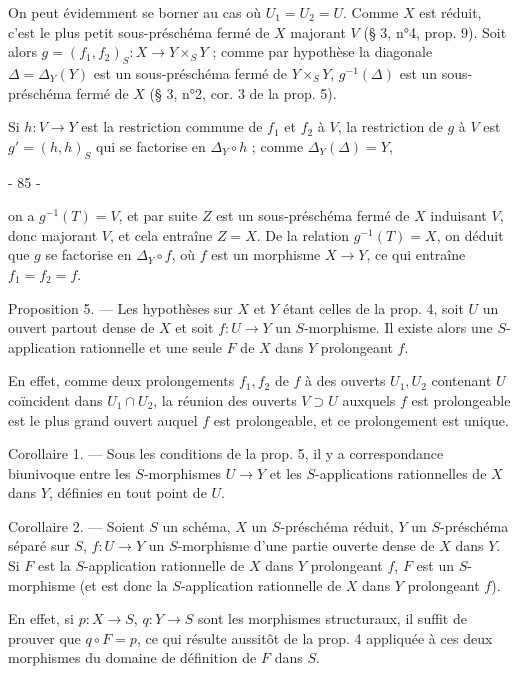 On peut évidemment se borner au cas où $U_1 = U_2 = U$. Comme $X$ est réduit, c'est le plus petit sous-préschéma fermé de $X$ majorant $V$ (§ 3, n°4, prop. 9). Soit alors $g = (f_1, f_2)_S : X \to Y \times_S Y$ ; comme par hypothèse la diagonale $\Delta = \Delta_Y(Y)$ est un sous-préschéma fermé de $Y \times_S Y$, $g^{-1}(\Delta)$ est un sous-préschéma fermé de $X$ (§ 3, n°2, cor. 3 de la prop. 5).

Si $h : V \to Y$ est la restriction commune de $f_1$ et $f_2$ à $V$, la restriction de $g$ à $V$ est $g' = (h, h)_S$ qui se factorise en $\Delta_Y \circ h$ ; comme $\Delta_Y(\Delta) = Y$,

\newpage


- 85 -

on a $g^{-1}(T) = V$, et par suite $Z$ est un sous-préschéma fermé de $X$ induisant $V$, donc majorant $V$, et cela entraîne $Z = X$. De la relation $g^{-1}(T) = X$, on déduit que $g$ se factorise en $\Delta_Y \circ f$, où $f$ est un morphisme $X \to Y$, ce qui entraîne $f_1 = f_2 = f$.

Proposition 5. — Les hypothèses sur $X$ et $Y$ étant celles de la prop. 4, soit $U$ un ouvert partout dense de $X$ et soit $f : U \to Y$ un $S$-morphisme. Il existe alors une $S$-application rationnelle et une seule $F$ de $X$ dans $Y$ prolongeant $f$.

En effet, comme deux prolongements $f_1, f_2$ de $f$ à des ouverts $U_1, U_2$ contenant $U$ coïncident dans $U_1 \cap U_2$, la réunion des ouverts $V \supset U$ auxquels $f$ est prolongeable est le plus grand ouvert auquel $f$ est prolongeable, et ce prolongement est unique.

Corollaire 1. — Sous les conditions de la prop. 5, il y a correspondance biunivoque entre les $S$-morphismes $U \to Y$ et les $S$-applications rationnelles de $X$ dans $Y$, définies en tout point de $U$.

Corollaire 2. — Soient $S$ un schéma, $X$ un $S$-préschéma réduit, $Y$ un $S$-préschéma séparé sur $S$, $f : U \to Y$ un $S$-morphisme d'une partie ouverte dense de $X$ dans $Y$. Si $F$ est la $S$-application rationnelle de $X$ dans $Y$ prolongeant $f$, $F$ est un $S$-morphisme (et est donc la $S$-application rationnelle de $X$ dans $Y$ prolongeant $f$).

En effet, si $p : X \to S$, $q : Y \to S$ sont les morphismes structuraux, il suffit de prouver que $q \circ F = p$, ce qui résulte aussitôt de la prop. 4 appliquée à ces deux morphismes du domaine de définition de $F$ dans $S$.

